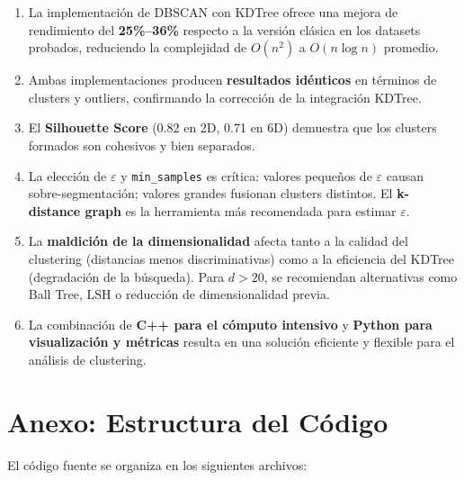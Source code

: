 \documentclass[12pt,a4paper]{article}
\begin{document}
\begin{enumerate}
    \item La implementación de DBSCAN con KDTree ofrece una mejora de rendimiento del \textbf{25\%--36\%} respecto a la versión clásica en los datasets probados, reduciendo la complejidad de $O(n^2)$ a $O(n \log n)$ promedio.
    
    \item Ambas implementaciones producen \textbf{resultados idénticos} en términos de clusters y outliers, confirmando la corrección de la integración KDTree.
    
    \item El \textbf{Silhouette Score} (0.82 en 2D, 0.71 en 6D) demuestra que los clusters formados son cohesivos y bien separados.
    
    \item La elección de $\varepsilon$ y \texttt{min\_samples} es crítica: valores pequeños de $\varepsilon$ causan sobre-segmentación; valores grandes fusionan clusters distintos. El \textbf{k-distance graph} es la herramienta más recomendada para estimar $\varepsilon$.
    
    \item La \textbf{maldición de la dimensionalidad} afecta tanto a la calidad del clustering (distancias menos discriminativas) como a la eficiencia del KDTree (degradación de la búsqueda). Para $d > 20$, se recomiendan alternativas como Ball Tree, LSH o reducción de dimensionalidad previa.
    
    \item La combinación de \textbf{C++ para el cómputo intensivo} y \textbf{Python para visualización y métricas} resulta en una solución eficiente y flexible para el análisis de clustering.
\end{enumerate}

\section{Anexo: Estructura del Código}

El código fuente se organiza en los siguientes archivos:
\end{document}
